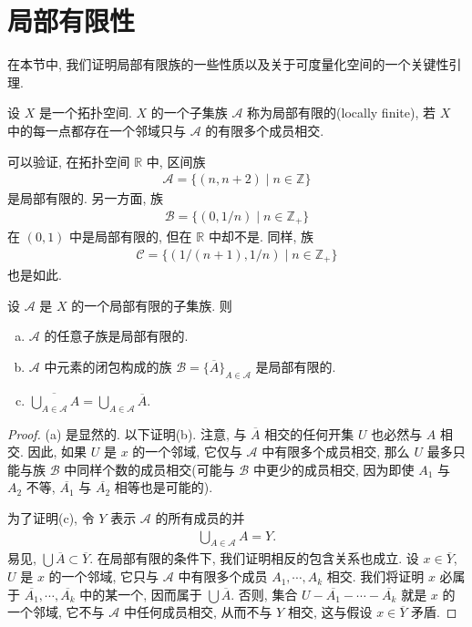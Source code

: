 \documentclass[../../main.tex]{subfiles}
\begin{document}
\section{局部有限性}\label{section:ch06-locally-finite}

在本节中, 我们证明局部有限族的一些性质以及关于可度量化空间的一个关键性引理.

\begin{definition}\label{definition:ch06-locally-finite}
设 $X$ 是一个拓扑空间. $X$ 的一个子集族 $\mathcal{A}$ 称为局部有限的(locally finite), 若 $X$ 中的每一点都存在一个邻域只与 $\mathcal{A}$ 的有限多个成员相交.
\end{definition}

\begin{examples}
可以验证, 在拓扑空间 $\mathbb{R}$ 中, 区间族
\begin{align*}
\mathcal{A}=\{(n,n+2)\mid n\in\mathbb{Z}\}
\end{align*}
是局部有限的. 另一方面, 族
\begin{align*}
\mathcal{B}=\{(0,1/n)\mid n\in\mathbb{Z}_+\}
\end{align*}
在 $(0,1)$ 中是局部有限的, 但在 $\mathbb{R}$ 中却不是. 同样, 族
\begin{align*}
\mathcal{C}=\{(1/(n+1),1/n)\mid n\in\mathbb{Z}_+\}
\end{align*}
也是如此.
\end{examples}

\begin{lemma}\label{lemma:ch06-locally-finite-properties}
设 $\mathcal{A}$ 是 $X$ 的一个局部有限的子集族. 则
\begin{enumerate}[(a)]
\item $\mathcal{A}$ 的任意子族是局部有限的.
\item $\mathcal{A}$ 中元素的闭包构成的族 $\mathcal{B}=\{\overline{A}\}_{A\in\mathcal{A}}$ 是局部有限的.
\item $\overline{\bigcup_{A\in\mathcal{A}} A}=\bigcup_{A\in\mathcal{A}}\overline{A}$.
\end{enumerate}
\end{lemma}

\begin{proof}
(a) 是显然的. 以下证明(b). 注意, 与 $\overline{A}$ 相交的任何开集 $U$ 也必然与 $A$ 相交. 因此, 如果 $U$ 是 $x$ 的一个邻域, 它仅与 $\mathcal{A}$ 中有限多个成员相交, 那么 $U$ 最多只能与族 $\mathcal{B}$ 中同样个数的成员相交(可能与 $\mathcal{B}$ 中更少的成员相交, 因为即使 $A_1$ 与 $A_2$ 不等, $\overline{A_1}$ 与 $\overline{A_2}$ 相等也是可能的).

为了证明(c), 令 $Y$ 表示 $\mathcal{A}$ 的所有成员的并
\begin{align*}
\bigcup_{A\in\mathcal{A}}A=Y.
\end{align*}
易见, $\bigcup\overline{A}\subset\overline{Y}$. 在局部有限的条件下, 我们证明相反的包含关系也成立. 设 $x\in\overline{Y}$, $U$ 是 $x$ 的一个邻域, 它只与 $\mathcal{A}$ 中有限多个成员 $A_1,\cdots,A_k$ 相交. 我们将证明 $x$ 必属于 $\overline{A_1},\cdots,\overline{A_k}$ 中的某一个, 因而属于 $\bigcup\overline{A}$. 否则, 集合 $U-\overline{A_1}-\cdots-\overline{A_k}$ 就是 $x$ 的一个邻域, 它不与 $\mathcal{A}$ 中任何成员相交, 从而不与 $Y$ 相交, 这与假设 $x\in\overline{Y}$ 矛盾.
\end{proof}
\end{document}
